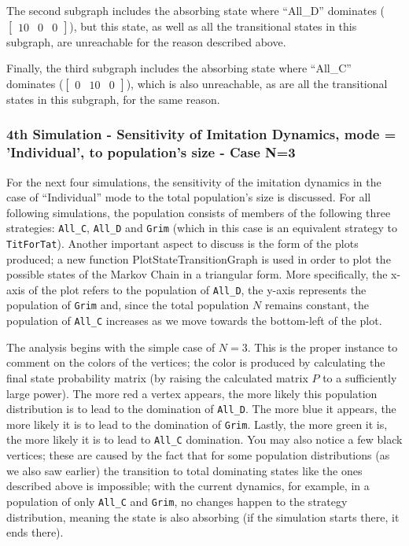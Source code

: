 The second subgraph includes the absorbing state where ``All\_D'' dominates ($\begin{bmatrix}10 & 0 & 0\end{bmatrix}$), but this state, as well as all the transitional states in this subgraph, are unreachable for the reason described above.

Finally, the third subgraph includes the absorbing state where ``All\_C'' dominates ($\begin{bmatrix}0 & 10 & 0\end{bmatrix}$), which is also unreachable, as are all the transitional states in this subgraph, for the same reason. 

\subsubsection{4th Simulation - Sensitivity of Imitation Dynamics, mode = 'Individual', to population's size - Case N=3}
For the next four simulations, the sensitivity of the imitation dynamics in the case of ``Individual'' mode to the total population's size is discussed. For all following simulations, the population consists of members of the following three strategies: \texttt{All\_C}, \texttt{All\_D} and \texttt{Grim} (which in this case is an equivalent strategy to \texttt{TitForTat}). Another important aspect to discuss is the form of the plots produced; a new function PlotStateTransitionGraph is used in order to plot the possible states of the Markov Chain in a triangular form. More specifically, the x-axis of the plot refers to the population of \texttt{All\_D}, the y-axis represents the population of \texttt{Grim} and, since the total population $N$ remains constant, the population of \texttt{All\_C} increases as we move towards the bottom-left of the plot. 

The analysis begins with the simple case of $N=3$. This is the proper instance to comment on the colors of the vertices; the color is produced by calculating the final state probability matrix (by raising the calculated matrix $P$ to a sufficiently large power). The more red a vertex appears, the more likely this population distribution is to lead to the domination of \texttt{All\_D}. The more blue it appears, the more likely it is to lead to the domination of \texttt{Grim}. Lastly, the more green it is, the more likely it is to lead to \texttt{All\_C} domination. You may also notice a few black vertices; these are caused by the fact that for some population distributions (as we also saw earlier) the transition to total dominating states like the ones described above is impossible; with the current dynamics, for example, in a population of only \texttt{All\_C} and \texttt{Grim}, no changes happen to the strategy distribution, meaning the state is also absorbing (if the simulation starts there, it ends there).

